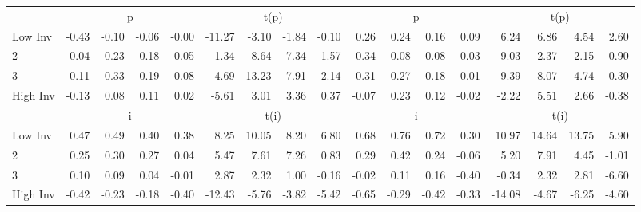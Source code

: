 \begin{table}[!ht]
\begin{tabular}{lrrrrrrrrrrrrrrrr}
  
    
      & \multicolumn{4}{c}{p} & \multicolumn{4}{c}{t(p)}
    
      & \multicolumn{4}{c}{p} & \multicolumn{4}{c}{t(p)}
    
    \\
      \cmidrule(r){2-5} \cmidrule(r){6-9} \cmidrule(r){10-13} \cmidrule(r){14-17}

    Low Inv   & -0.43  & -0.10  & -0.06  & -0.00  & -11.27  & -3.10  & -1.84  & -0.10  & 0.26  & 0.24  & 0.16  & 0.09  & 6.24  & 6.86  & 4.54  & 2.60  \\
           2  & 0.04  & 0.23  & 0.18  & 0.05  & 1.34  & 8.64  & 7.34  & 1.57  & 0.34  & 0.08  & 0.08  & 0.03  & 9.03  & 2.37  & 2.15  & 0.90  \\
           3  & 0.11  & 0.33  & 0.19  & 0.08  & 4.69  & 13.23  & 7.91  & 2.14  & 0.31  & 0.27  & 0.18  & -0.01  & 9.39  & 8.07  & 4.74  & -0.30  \\
    High Inv  & -0.13  & 0.08  & 0.11  & 0.02  & -5.61  & 3.01  & 3.36  & 0.37  & -0.07  & 0.23  & 0.12  & -0.02  & -2.22  & 5.51  & 2.66  & -0.38  \\

  
    
      & \multicolumn{4}{c}{i} & \multicolumn{4}{c}{t(i)}
    
      & \multicolumn{4}{c}{i} & \multicolumn{4}{c}{t(i)}
    
    \\
      \cmidrule(r){2-5} \cmidrule(r){6-9} \cmidrule(r){10-13} \cmidrule(r){14-17}

    Low Inv   & 0.47  & 0.49  & 0.40  & 0.38  & 8.25  & 10.05  & 8.20  & 6.80  & 0.68  & 0.76  & 0.72  & 0.30  & 10.97  & 14.64  & 13.75  & 5.90  \\
           2  & 0.25  & 0.30  & 0.27  & 0.04  & 5.47  & 7.61  & 7.26  & 0.83  & 0.29  & 0.42  & 0.24  & -0.06  & 5.20  & 7.91  & 4.45  & -1.01  \\
           3  & 0.10  & 0.09  & 0.04  & -0.01  & 2.87  & 2.32  & 1.00  & -0.16  & -0.02  & 0.11  & 0.16  & -0.40  & -0.34  & 2.32  & 2.81  & -6.60  \\
    High Inv  & -0.42  & -0.23  & -0.18  & -0.40  & -12.43  & -5.76  & -3.82  & -5.42  & -0.65  & -0.29  & -0.42  & -0.33  & -14.08  & -4.67  & -6.25  & -4.60  \\

  

  \bottomrule
\end{tabular}
\label{tbl:32_Size_BM_Inv_F15}
\end{table}